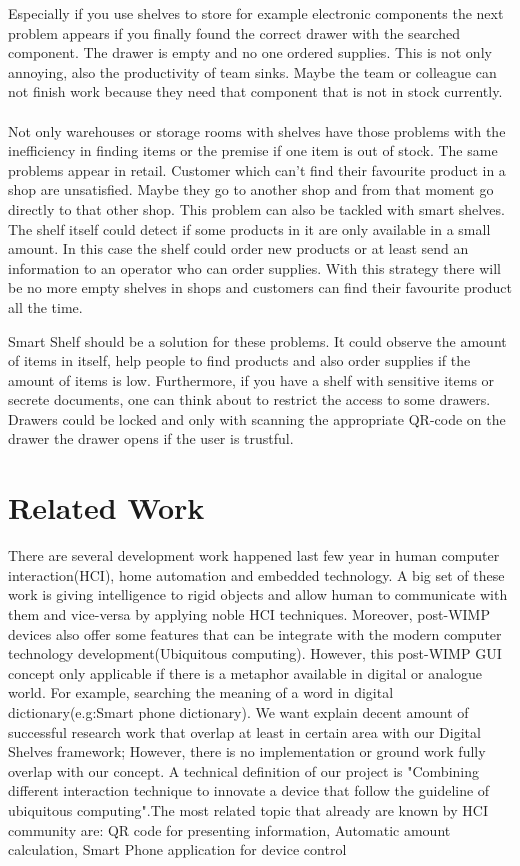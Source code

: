 \documentclass{sigchi}
\begin{document}
Especially if you use shelves to store for example electronic components the next problem appears if you finally found the correct drawer with the searched component. 
The drawer is empty and no one ordered supplies. 
This is not only annoying, also the productivity of team sinks. 
Maybe the team or colleague can not finish work because they need that component that is not in stock currently. 
\\
\\
Not only warehouses or storage rooms with shelves have those problems with the inefficiency in finding items or the premise if one item is out of stock. 
The same problems appear in retail. 
Customer which can't find their favourite product in a shop are unsatisfied. 
Maybe they go to another shop and from that moment go directly to that other shop. 
This problem can also be tackled with smart shelves. 
The shelf itself could detect if some products in it are only available in a small amount. 
In this case the shelf could order new products or at least send an information to an operator who can order supplies. 
With this strategy there will be no more empty shelves in shops and customers can find their favourite product all the time. 

Smart Shelf should be a solution for these problems. 
It could observe the amount of items in itself, help people to find products and also order supplies if the amount of items is low. 
Furthermore, if you have a shelf with sensitive items or secrete documents, one can think about to restrict the access to some drawers. 
Drawers could be locked and only with scanning the appropriate QR-code on the drawer the drawer opens if the user is trustful. 


\section{Related Work}

There are several development work happened last few year in human computer interaction(HCI), home automation and embedded technology. A big set of these work is giving intelligence to rigid objects and allow human to communicate with them and vice-versa by applying noble HCI techniques. Moreover, post-WIMP devices also offer some features that can be integrate with the modern computer technology development(Ubiquitous computing). However, this post-WIMP GUI concept only applicable if there is a metaphor available in digital or analogue world. For example, searching the meaning of a word in digital dictionary(e.g:Smart phone dictionary). We want explain decent amount of successful research work that overlap at least in certain area with our Digital Shelves framework; However, there is no implementation or ground work fully overlap with our concept. A technical definition of our project is "Combining different interaction technique to innovate a device that follow the guideline of ubiquitous computing".The most related topic that already are known by HCI community are: QR code for presenting information, Automatic amount calculation, Smart Phone application for device control     
\end{document}
